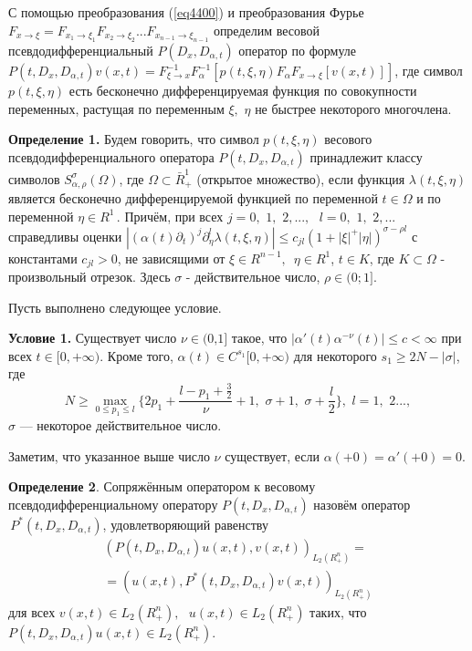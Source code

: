 {С помощью преобразования (\ref{eq4400}) и преобразования Фурье $F_{x \to \xi } = F_{x_1
\to \xi _1 } F_{x_2 \to \xi _2 } ...F_{x_{n - 1} \to \xi _{n - 1} } $
определим весовой псевдодифференциальный $P(D_x ,D_{\alpha ,t} )$ оператор
по формуле $P(t,D_x ,D_{\alpha ,t} )v(x,t) = F_{\xi \to x}^{ - 1} F_\alpha
^{ - 1} [p(t,\xi ,\eta )F_\alpha F_{x \to \xi } [v(x,t)]]$,
где символ $p(t,\xi ,\eta )$ есть бесконечно дифференцируемая функция по
совокупности переменных, растущая по переменным $\xi ,\,\,\eta $ не быстрее
некоторого многочлена.

\textbf{Определение 1.} Будем говорить, что символ $p(t,\xi ,\eta )$
весового псевдодифференциального оператора $P(t,D_x ,D_{\alpha ,t} )$
принадлежит классу символов $S_{\alpha ,\rho }^\sigma (\Omega )$, где
$\Omega \subset \bar {R}_ + ^1 $ (открытое множество), если функция $\lambda
(t,\xi ,\eta )$ является бесконечно дифференцируемой функцией по переменной
$t \in \Omega $ и по переменной $\eta \in R^1\,$. Причём, при всех $j =
0,\,\,1,\,\,2,...,\,\,\,\,l = 0,\,\,1,\,\,2,...$ справедливы оценки $\left|
{(\alpha (t)\partial _t )^j\partial _\eta ^l \lambda (t,\xi ,\eta )} \right|
\leqslant c_{jl} (1 + \left| \xi \right|^ + \left| \eta \right|)^{\sigma - \rho
l}$ с константами $c_{jl} > 0$, не зависящими от $\xi \in R^{n -
1},\,\,\,\eta \in R^1$, $t \in K$, где $K \subset \Omega $ - произвольный
отрезок. Здесь $\sigma $ - действительное число, $\rho \in (0;1]$.

Пусть выполнено следующее условие.

\textbf{Условие 1.} Существует число $\nu \in \mbox{(0,1]}$ такое, что
$\left| {\alpha '(t)\alpha ^{ - \nu }(t)} \right| \leqslant c < \infty $ при всех
$t \in [0, + \infty )$. Кроме того, $\alpha (t) \in C^{s_1 }[0, + \infty )$
для некоторого $s_1 \geqslant 2N - \left| \sigma \right|$, где
\[
N \geqslant \mathop {\max }\limits_{0 \leqslant p_1 \leqslant l} \{2p_1 + \frac{l - p_1 +
\frac{3}{2}}{\nu } + 1,\,\,\sigma + 1,\,\,\sigma + \frac{l}{2}\},\,\,l =
1,\,\,2...,
\]
$\sigma$ --- некоторое действительное число.



Заметим, что указанное выше число $\nu $ существует, если $\alpha ( + 0) =
\alpha '( + 0) = 0$.

\textbf{Определение 2}. Сопряжённым оператором к весовому
псевдодифференциальному оператору $P(t,D_x ,D_{\alpha ,t} )$ назовём
оператор $\,P^\ast (t,D_x ,D_{\alpha ,t} )$, удовлетворяющий равенству
\begin{multline*}
(P(t,D_x ,D_{\alpha ,t} )u(x,t),v(x,t))_{L_2 (R_ + ^n )} =
\\=
(u(x,t),P^\ast
(t,D_x ,D_{\alpha ,t} )v(x,t))_{L_2 (R_ + ^n )}
\end{multline*}
для всех $v(x,t) \in L_2 (R_ + ^n ),\,\,\,\,u(x,t) \in L_2 (R_ + ^n )$
таких, что $P(t,D_x ,D_{\alpha ,t} )u(x,t) \in L_2 (R_ + ^n )$.

}
